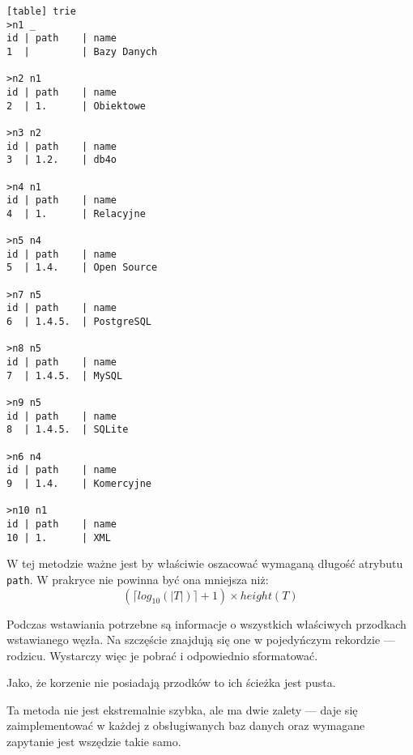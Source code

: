 \begin{verbatim}[table] trie
>n1 _
id | path    | name
1  |         | Bazy Danych

>n2 n1
id | path    | name
2  | 1.      | Obiektowe

>n3 n2
id | path    | name
3  | 1.2.    | db4o

>n4 n1
id | path    | name
4  | 1.      | Relacyjne

>n5 n4
id | path    | name
5  | 1.4.    | Open Source

>n7 n5
id | path    | name
6  | 1.4.5.  | PostgreSQL

>n8 n5
id | path    | name
7  | 1.4.5.  | MySQL

>n9 n5
id | path    | name
8  | 1.4.5.  | SQLite

>n6 n4
id | path    | name
9  | 1.4.    | Komercyjne

>n10 n1
id | path    | name
10 | 1.      | XML

\end{verbatim}



W tej metodzie ważne jest by właściwie oszacować wymaganą długość atrybutu \texttt{path}.
W prakryce nie powinna być ona mniejsza niż:
\begin{displaymath}
    (\lceil log_{10}(|T|) \rceil + 1) \times height(T)
\end{displaymath}




Podczas wstawiania potrzebne są informacje o wszystkich właściwych przodkach wstawianego węzła.
Na szczęście znajdują się one w pojedyńczym rekordzie --- rodzicu.
Wystarczy więc je pobrać i odpowiednio sformatować.



Jako, że korzenie nie posiadają przodków to ich ścieżka jest pusta. 





Ta metoda nie jest ekstremalnie szybka, ale ma dwie zalety ---
daje się zaimplementować w każdej z obsługiwanych baz danych oraz wymagane zapytanie jest wszędzie takie samo.



